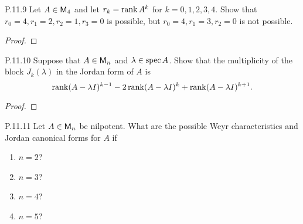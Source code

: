 \documentclass{../homework}
\begin{document}
\begin{problems}
\item[P.11.9] Let \(A \in \mathsf{M}_4\) and let \(r_k = \operatorname{rank} A^k\) for
  \(k = 0, 1, 2, 3, 4\).  Show that
  \(r_0 = 4, r_1 = 2, r_2 = 1, r_3 = 0\) is possible, but
  \(r_0 = 4, r_1 = 3, r_2 = 0\) is not possible.

  \begin{solution}
    \begin{proof}

    \end{proof}
  \end{solution}

\item[P.11.10] Suppose that \(A \in \mathsf{M}_n\) and
  \(\lambda \in \operatorname{spec} A\).  Show that the multiplicity of the block
  \(J_k(\lambda)\) in the Jordan form of \(A\) is
  \[
    \operatorname{rank}(A-\lambda I)^{k-1}
    - 2 \operatorname{rank}(A-\lambda I)^k
    + \operatorname{rank}(A-\lambda I)^{k+1}.
  \]

  \begin{solution}
    \begin{proof}

    \end{proof}
  \end{solution}

\item[P.11.11] Let \(A \in \mathsf{M}_n\) be nilpotent.  What are the possible
  Weyr characteristics and Jordan canonical forms for \(A\) if
  \begin{enumerate}
  \item \(n=2\)?

    \begin{solution}

    \end{solution}

  \item \(n=3\)?

    \begin{solution}

    \end{solution}

  \item \(n=4\)?

    \begin{solution}

    \end{solution}

  \item \(n=5\)?

    \begin{solution}

    \end{solution}
  \end{enumerate}


\end{problems}
\end{document}
